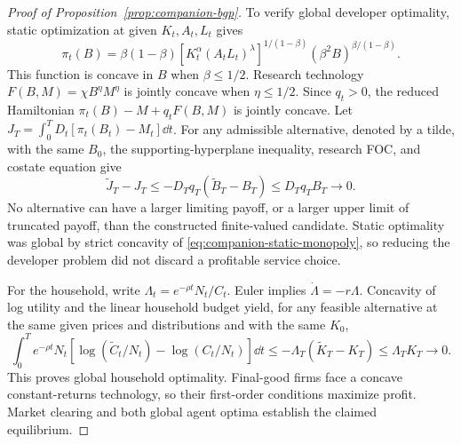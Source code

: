 \begin{proof}[Proof of Proposition~\ref{prop:companion-bgp}]
To verify global developer optimality, static optimization at given
$K_t,A_t,L_t$ gives
\begin{equation}
 \pi_t(B)=\beta(1-\beta)
 [K_t^\alpha(A_tL_t)^\lambda]^{1/(1-\beta)}
 (\beta^2B)^{\beta/(1-\beta)}.
 \label{eq:companion-profit-function}
\end{equation}
This function is concave in $B$ when $\beta\leq1/2$. Research technology
$F(B,M)=\chi B^\eta M^\eta$ is jointly concave when $\eta\leq1/2$.
Since $q_t>0$, the reduced Hamiltonian $\pi_t(B)-M+q_tF(B,M)$ is jointly
concave. Let $J_T=\int_0^T D_t[\pi_t(B_t)-M_t]\dd t$.
For any admissible alternative, denoted by a tilde, with the same $B_0$,
the supporting-hyperplane inequality, research FOC, and costate equation give
\begin{equation}
 \widetilde J_T-J_T
 \leq-D_Tq_T(\widetilde B_T-B_T)
 \leq D_Tq_TB_T\longrightarrow0.
 \label{eq:companion-developer-verification}
\end{equation}
No alternative can have a larger limiting payoff, or a larger upper limit
of truncated payoff, than the constructed finite-valued candidate. Static
optimality was global by strict concavity of
\eqref{eq:companion-static-monopoly}, so reducing the developer problem did
not discard a profitable service choice.

For the household, write $\Lambda_t=e^{-\rho t}N_t/C_t$. Euler implies
$\dot\Lambda=-r\Lambda$. Concavity of log utility and the linear household
budget yield, for any feasible alternative at the same given prices and
distributions and with the same $K_0$,
\begin{equation}
 \int_0^T e^{-\rho t}N_t
 [\log(\widetilde C_t/N_t)-\log(C_t/N_t)]\dd t
 \leq-\Lambda_T(\widetilde K_T-K_T)
 \leq\Lambda_TK_T\longrightarrow0.
 \label{eq:companion-household-verification}
\end{equation}
This proves global household optimality. Final-good firms face a concave
constant-returns technology, so their first-order conditions maximize profit.
Market clearing and both global agent optima establish the claimed equilibrium.
\end{proof}
